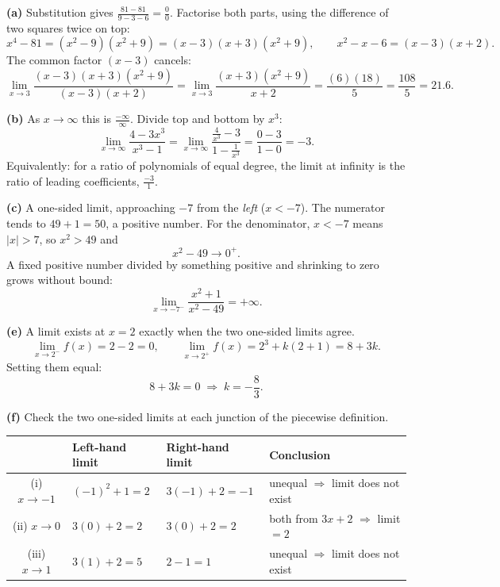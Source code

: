 \begin{solution}
\textbf{(a)} Substitution gives $\tfrac{81-81}{9-3-6}=\tfrac00$. Factorise both
parts, using the difference of two squares twice on top:
\[
x^{4}-81=(x^{2}-9)(x^{2}+9)=(x-3)(x+3)(x^{2}+9),
\qquad
x^{2}-x-6=(x-3)(x+2).
\]
The common factor $(x-3)$ cancels:
\[
\lim_{x\to3}\frac{(x-3)(x+3)(x^{2}+9)}{(x-3)(x+2)}
=\lim_{x\to3}\frac{(x+3)(x^{2}+9)}{x+2}
=\frac{(6)(18)}{5}=\frac{108}{5}=21.6 .
\]

\medskip
\textbf{(b)} As $x\to\infty$ this is $\tfrac{-\infty}{\infty}$. Divide top and
bottom by $x^{3}$:
\[
\lim_{x\to\infty}\frac{4-3x^{3}}{x^{3}-1}
=\lim_{x\to\infty}\frac{\tfrac{4}{x^{3}}-3}{1-\tfrac{1}{x^{3}}}
=\frac{0-3}{1-0}=-3 .
\]
Equivalently: for a ratio of polynomials of equal degree, the limit at infinity
is the ratio of leading coefficients, $\tfrac{-3}{1}$.

\medskip
\textbf{(c)} A one-sided limit, approaching $-7$ from the \emph{left}
($x<-7$). The numerator tends to $49+1=50$, a positive number. For the
denominator, $x<-7$ means $|x|>7$, so $x^{2}>49$ and
\[
x^{2}-49\to 0^{+} .
\]
A fixed positive number divided by something positive and shrinking to zero
grows without bound:
\[
\lim_{x\to-7^{-}}\frac{x^{2}+1}{x^{2}-49}=+\infty .
\]

\medskip
\textbf{(e)} A limit exists at $x=2$ exactly when the two one-sided limits
agree.
\[
\lim_{x\to2^{-}}f(x)=2-2=0,
\qquad
\lim_{x\to2^{+}}f(x)=2^{3}+k(2+1)=8+3k .
\]
Setting them equal:
\[
8+3k=0 \;\Longrightarrow\; k=-\frac83 .
\]

\medskip
\textbf{(f)} Check the two one-sided limits at each junction of the piecewise
definition.

\begin{center}
\small\sffamily
\begin{tabular}{@{}c C{3.0cm} C{3.0cm} L{5.0cm}@{}}
\toprule
 & Left-hand limit & Right-hand limit & Conclusion \\
\midrule
(i) $x\to-1$ & $(-1)^{2}+1=2$ & $3(-1)+2=-1$ & unequal $\Rightarrow$ limit does not exist \\
(ii) $x\to 0$ & $3(0)+2=2$ & $3(0)+2=2$ & both from $3x+2$ $\Rightarrow$ limit $=2$ \\
(iii) $x\to 1$ & $3(1)+2=5$ & $2-1=1$ & unequal $\Rightarrow$ limit does not exist \\
\bottomrule
\end{tabular}
\end{center}


\end{solution}
